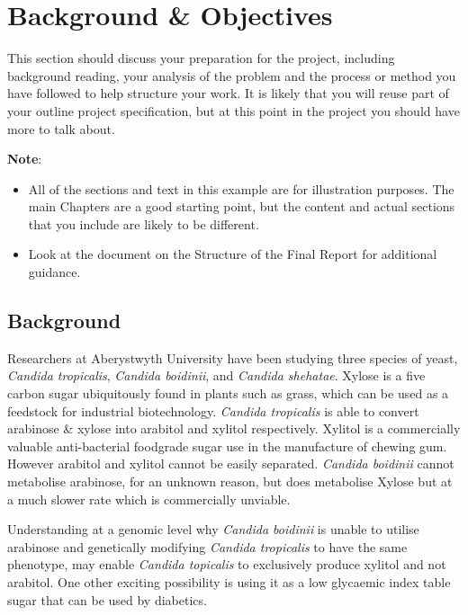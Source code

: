 \chapter{Background \& Objectives}
This section should discuss your preparation for the project, including background reading, your analysis of the problem and the process or method you have followed to help structure your work.  It is likely that you will reuse part of your outline project specification, but at this point in the project you should have more to talk about. 

\textbf{Note}: 

\begin{itemize}
   \item All of the sections and text in this example are for illustration purposes. The main Chapters are a good starting point, but the content and actual sections that you include are likely to be different.
   
   \item Look at the document on the Structure of the Final Report for additional guidance. 
   
\end {itemize}

\section{Background}
Researchers at Aberystwyth University have been studying three species of yeast, \textit{Candida tropicalis}, \textit{Candida boidinii}, and \textit{Candida shehatae}. Xylose is a five carbon sugar ubiquitously found in plants such as grass, which can be used as a feedstock for industrial biotechnology. \textit{Candida tropicalis} is able to convert arabinose & xylose into arabitol and xylitol respectively. Xylitol is a commercially valuable anti-bacterial foodgrade sugar use in the manufacture of chewing gum. However arabitol and xylitol cannot be easily separated. \textit{Candida boidinii} cannot metabolise arabinose, for an unknown reason, but does metabolise Xylose but at a much slower
rate which is commercially unviable.

Understanding at a genomic level why \textit{Candida boidinii} is unable to utilise arabinose and genetically modifying \textit{Candida tropicalis} to have the same phenotype, may enable \textit{Candida topicalis} to exclusively produce xylitol and not arabitol. One other exciting possibility is using it as a low glycaemic index table sugar that can be used by diabetics.

